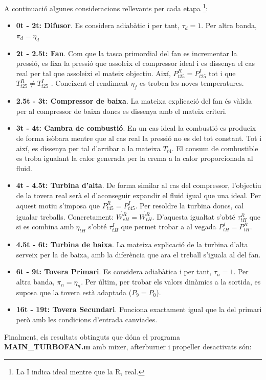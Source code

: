 A continuació algunes consideracions rellevants per cada etapa \footnote{La I indica ideal mentre que la R, real.}:
\begin{itemize}
\item \textbf{0t - 2t: Difusor}. Es considera adiabàtic i per tant, $\tau_d = 1$. Per altra banda, $\pi_d = \eta_d$
\item \textbf{2t - 2.5t: Fan}. Com que la tasca primordial del fan es incrementar la pressió, es fixa la pressió que assoleix el compressor ideal i es dissenya el cas real per tal que assoleixi el mateix objectiu. Així, $P_{t25}^R = P_{t25}^I$ tot i que $T_{t25}^R \neq T_{t25}^I$ . Coneixent el rendiment $\eta_f$ es troben les noves temperatures.
\item \textbf{2.5t - 3t: Compressor de baixa}. La mateixa explicació del fan és vàlida per al compressor de baixa doncs es dissenya amb el mateix criteri.
\item \textbf{3t - 4t: Cambra de combustió}. En un cas ideal la combustió es produeix de forma isòbara mentre que al cas real la pressió no es del tot constant. Tot i així, es dissenya per tal d'arribar a la mateixa $T_{t4}$. El consum de combustible es troba igualant la calor generada per la crema a la calor proporcionada al fluid.
\item \textbf{4t - 4.5t: Turbina d'alta}. De forma similar al cas del compressor, l'objectiu de la tovera real serà el d'aconseguir expandir el fluid igual que una ideal. Per aquest motiu s'imposa que $P_{t45}^R = P_{t45}^I$.  Per resoldre la turbina doncs, cal igualar treballs. Concretament: $\dot{W_{cH}^R} = \dot{W_{tH}^R} $. D'aquesta igualtat s'obté $\tau_{tH}^R$ que si es combina amb $\eta_{tH}$ s'obté $\tau_{tH}^I$ que permet trobar a al vegada $P_{tH}^{I} = P_{tH}^{R}$.
\item \textbf{4.5t - 6t: Turbina de baixa}. La mateixa explicació de la turbina d'alta serveix per la de baixa, amb la diferència que ara el treball s'iguala al del fan.
\item \textbf{6t - 9t: Tovera Primari}. Es considera adiabàtica i per tant, $\tau_n = 1$. Per altra banda, $\pi_n = \eta_n$. Per últim, per trobar els valors dinàmics a la sortida, es suposa que la tovera està adaptada ($P_9 = P_0$).
\item \textbf{16t - 19t: Tovera Secundari}. Funciona exactament igual que la del primari però amb les condicions d'entrada canviades.
\end{itemize}
Finalment, els resultats obtinguts que dóna el programa \textbf{MAIN\_TURBOFAN.m} amb mixer, afterburner i propeller desactivats són:
